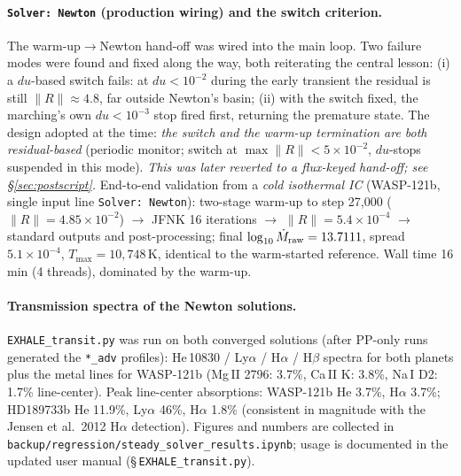 \documentclass[english,a4paper]{my_memo}
\newcommand{\code}[1]{\texttt{#1}}
\begin{document}
\paragraph{\code{Solver: Newton} (production wiring) and the switch
criterion.} The warm-up$\to$Newton hand-off was wired into the main loop.
Two failure modes were found and fixed along the way, both reiterating the
central lesson: (i) a $du$-based switch fails: at $du<10^{-2}$ during the
early transient the residual is still $\|R\|\approx4.8$, far outside
Newton's basin; (ii) with the switch fixed, the marching's own $du<10^{-3}$
stop fired first, returning the premature state. The design adopted at
the time: \emph{the switch and the warm-up termination are both residual-based}
(periodic monitor; switch at $\max\|R\|<5\times10^{-2}$, $du$-stops
suspended in this mode). \emph{This was later reverted to a flux-keyed
hand-off; see \S\ref{sec:postscript}.} End-to-end validation from a \emph{cold
isothermal IC} (WASP-121b, single input line \code{Solver: Newton}):
two-stage warm-up to step 27{,}000 ($\|R\|=4.85\times10^{-2}$) $\to$ JFNK
16 iterations $\to$ $\|R\|=5.4\times10^{-4}$ $\to$ standard outputs and
post-processing; final $\log_{10}\dot M_{\rm raw}=13.7111$, spread
$5.1\times10^{-4}$, $T_{\max}=10{,}748$\,K, identical to the
warm-started reference. Wall time 16 min (4 threads), dominated by the
warm-up.

\paragraph{Transmission spectra of the Newton solutions.} \code{EXHALE\_transit.py}
was run on both converged solutions (after PP-only runs generated the
\code{*\_adv} profiles): He\,10830 / Ly$\alpha$ / H$\alpha$ / H$\beta$
spectra for both planets plus the metal lines for WASP-121b
(Mg\,II 2796: 3.7\%, Ca\,II K: 3.8\%, Na\,I D2: 1.7\% line-center).
Peak line-center absorptions: WASP-121b He 3.7\%, H$\alpha$ 3.7\%;
HD189733b He 11.9\%, Ly$\alpha$ 46\%, H$\alpha$ 1.8\% (consistent in
magnitude with the Jensen et al.\ 2012 H$\alpha$ detection). Figures and
numbers are collected in
\code{backup/regression/steady\_solver\_results.ipynb}; usage is documented in
the updated user manual (\S\,\code{EXHALE\_transit.py}).
\end{document}
